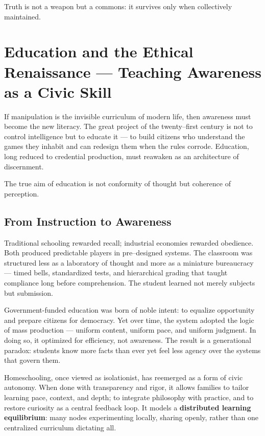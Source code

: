 \documentclass[12pt,twoside]{book}
\begin{document}
\begin{keyidea}
Truth is not a weapon but a commons: it survives only when collectively maintained.
\end{keyidea}


\chapter{Education and the Ethical Renaissance — Teaching Awareness as a Civic Skill}

If manipulation is the invisible curriculum of modern life, then awareness must become the new literacy.  
The great project of the twenty–first century is not to control intelligence but to educate it — to build citizens who understand the games they inhabit and can redesign them when the rules corrode.  
Education, long reduced to credential production, must reawaken as an architecture of discernment.\\

\begin{keyidea}
The true aim of education is not conformity of thought but coherence of perception.
\end{keyidea}

\section{From Instruction to Awareness}

Traditional schooling rewarded recall; industrial economies rewarded obedience.  
Both produced predictable players in pre–designed systems.  
The classroom was structured less as a laboratory of thought and more as a miniature bureaucracy — timed bells, standardized tests, and hierarchical grading that taught compliance long before comprehension.  
The student learned not merely subjects but submission.

Government-funded education was born of noble intent: to equalize opportunity and prepare citizens for democracy.  
Yet over time, the system adopted the logic of mass production — uniform content, uniform pace, and uniform judgment.  
In doing so, it optimized for efficiency, not awareness.  
The result is a generational paradox: students know more facts than ever yet feel less agency over the systems that govern them.

Homeschooling, once viewed as isolationist, has reemerged as a form of civic autonomy.  
When done with transparency and rigor, it allows families to tailor learning pace, context, and depth; to integrate philosophy with practice, and to restore curiosity as a central feedback loop.  
It models a \textbf{distributed learning equilibrium}: many nodes experimenting locally, sharing openly, rather than one centralized curriculum dictating all.
\end{document}
